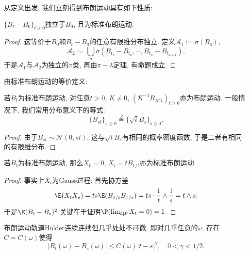 \documentclass[a4paper, 10pt]{ctexart}
\begin{document}
\sp 
从定义出发, 我们立刻得到布朗运动具有如下性质: 
\begin{theorem}[推移不变性]
	$\{B_t - B_0\}_{t \geq 0}$独立于$B_0$, 且为标准布朗运动. 
\end{theorem}
\begin{proof}
	这等价于$B_0$和$B_t - B_0$的任意有限维分布独立. 
	定义$\mathcal A_1 := \sigma(B_0)$,  
	\begin{equation*}
		\mathcal A_2
		:= \bigcup_n \sigma(B_{t_1} - B_{t_0}, \cdots, B_{t_n} - B_{t_{n-1}} ), 
	\end{equation*}
	于是$\mathcal A_1$与$\mathcal A_2$为独立的$\pi$类, 再由$\pi - \lambda$定理, 有命题成立. 
\end{proof}

由标准布朗运动的等价定义: 
\begin{theorem}[标度变换]
	若$B_t$为标准布朗运动, 对任意$t > 0$, $K \neq 0$, $(K^{-1} B_{K^2 t})_{t \geq 0}$亦为布朗运动. 
	一般情况下, 我们常用分布意义下的等式: 
	\begin{equation*}
		\{B_{st}\}_{s \geq 0} \stackrel{\mathcal L}{=} \{\sqrt{t} B_s\}_{s \geq 0}. 
	\end{equation*}
\end{theorem}
\begin{proof}
	由于$B_{st} \sim \mathcal N(0, st)$, 这与$\sqrt{t} B_s$有相同的概率密度函数, 于是二者有相同的有限维分布. 
\end{proof}

\begin{theorem}
	若$B_t$为标准布朗运动, 那么$X_0 = 0$, $X_t = t B_{1/t}$亦为标准布朗运动.
\end{theorem}
\begin{proof}
	事实上$X_t$为Gauss过程: 首先协方差
	\begin{equation*}
		\E(X_t X_s) = 
		ts \E(B_{1/t} B_{1/s}) 
		= ts \cdot \frac 1t \wedge \frac 1s
		= t \wedge s. 
	\end{equation*}
	于是$\E(B_t - B_s)^2 $
	关键在于证明$\P(\lim_{t \downarrow 0} X_t = 0) = 1$. 
\end{proof}

\begin{theorem}[轨道的Hölder连续性]
	布朗运动轨道Hölder连续连续但几乎处处不可微. 
	即对几乎任意的$\omega$, 存在$C = C(\omega)$使得
	\begin{equation*}
		|B_t(\omega) - B_s(\omega)| \leq C(\omega) |t - s|^{\gamma}, \quad 0 < \gamma < 1/2. 
	\end{equation*}
\end{theorem}
\end{document}

